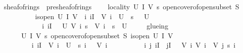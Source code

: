 \documentclass[12pt]{scrartcl}
\begin{document}
\begin{isabelle}
\isamarkupfalse%
\ sheaf{\isacharunderscore}{\kern0pt}of{\isacharunderscore}{\kern0pt}rings\ {\isacharequal}{\kern0pt}\ presheaf{\isacharunderscore}{\kern0pt}of{\isacharunderscore}{\kern0pt}rings\ {\isacharplus}{\kern0pt}\isanewline
\ \ \ locality{\isacharcolon}{\kern0pt}\ {\isachardoublequoteopen}{\isasymAnd}U\ I\ V\ s{\isachardot}{\kern0pt}\ open{\isacharunderscore}{\kern0pt}cover{\isacharunderscore}{\kern0pt}of{\isacharunderscore}{\kern0pt}open{\isacharunderscore}{\kern0pt}subset\ S\ \isanewline
\ \ \ \ \ \ \ \ \ \ is{\isacharunderscore}{\kern0pt}open\ U\ I\ V\ {\isasymLongrightarrow}\ {\isacharparenleft}{\kern0pt}{\isasymAnd}i{\isachardot}{\kern0pt}\ i{\isasymin}I\ {\isasymLongrightarrow}\ V\ i\ {\isasymsubseteq}\ U{\isacharparenright}{\kern0pt}\ {\isasymLongrightarrow}\ s\ {\isasymin}\ {\isasymFF}\ U\isanewline
\ \ \ \ \ \ \ \ \ \ \ {\isasymLongrightarrow}\ {\isacharparenleft}{\kern0pt}{\isasymAnd}i{\isachardot}{\kern0pt}\ i{\isasymin}I\ {\isasymLongrightarrow}\ {\isasymrho}\ U\ {\isacharparenleft}{\kern0pt}V\ i{\isacharparenright}{\kern0pt}\ s\ {\isacharequal}{\kern0pt}\ {\isasymzero}\isactrlbsub {\isacharparenleft}{\kern0pt}V\ i{\isacharparenright}{\kern0pt}\isactrlesub {\isacharparenright}{\kern0pt}\ {\isasymLongrightarrow}\ s\ {\isacharequal}{\kern0pt}\ {\isasymzero}\isactrlbsub U\isactrlesub {\isachardoublequoteclose}\isanewline
\ \ \ \ \ glueing{\isacharcolon}{\kern0pt}\ \ \isanewline
\ \ \ \ \ \ {\isachardoublequoteopen}{\isasymAnd}U\ I\ V\ s{\isachardot}{\kern0pt}\ open{\isacharunderscore}{\kern0pt}cover{\isacharunderscore}{\kern0pt}of{\isacharunderscore}{\kern0pt}open{\isacharunderscore}{\kern0pt}subset\ S\ is{\isacharunderscore}{\kern0pt}open\ U\ I\ V\ \isanewline
\ \ \ \ \ \ \ \ {\isasymLongrightarrow}\ {\isacharparenleft}{\kern0pt}{\isasymforall}i{\isachardot}{\kern0pt}\ i{\isasymin}I\ {\isasymlongrightarrow}\ V\ i\ {\isasymsubseteq}\ U\ {\isasymand}\ s\ i\ {\isasymin}\ {\isasymFF}\ {\isacharparenleft}{\kern0pt}V\ i{\isacharparenright}{\kern0pt}{\isacharparenright}{\kern0pt}\ \isanewline
\ \ \ \ \ \ \ \ {\isasymLongrightarrow}\ {\isacharparenleft}{\kern0pt}{\isasymAnd}i\ j{\isachardot}{\kern0pt}\ i{\isasymin}I\ {\isasymLongrightarrow}\ j{\isasymin}I\ {\isasymLongrightarrow}\ {\isasymrho}\ {\isacharparenleft}{\kern0pt}V\ i{\isacharparenright}{\kern0pt}\ {\isacharparenleft}{\kern0pt}V\ i\ {\isasyminter}\ V\ j{\isacharparenright}{\kern0pt}\ {\isacharparenleft}{\kern0pt}s\ i{\isacharparenright}{\kern0pt}\isanewline

\end{isabelle}
\end{document}
